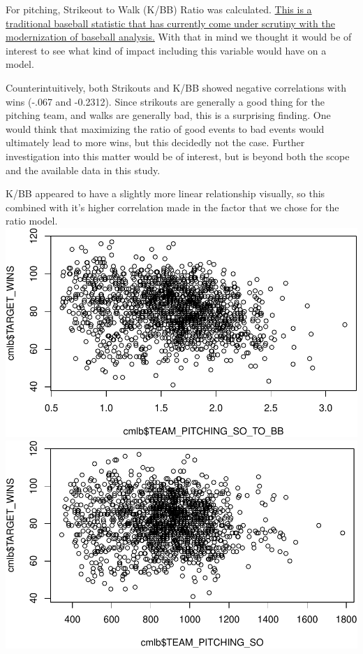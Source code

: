 \documentclass[]{article}
\begin{document}
For pitching, Strikeout to Walk (K/BB) Ratio was calculated.
\href{http://www.beyondtheboxscore.com/2012/11/25/3686732/stop-using-k-bb}{This
is a traditional baseball statistic that has currently come under
scrutiny with the modernization of baseball analysis.} With that in mind
we thought it would be of interest to see what kind of impact including
this variable would have on a model.

Counterintuitively, both Strikouts and K/BB showed negative correlations
with wins (-.067 and -0.2312). Since strikouts are generally a good
thing for the pitching team, and walks are generally bad, this is a
surprising finding. One would think that maximizing the ratio of good
events to bad events would ultimately lead to more wins, but this
decidedly not the case. Further investigation into this matter would be
of interest, but is beyond both the scope and the available data in this
study.

K/BB appeared to have a slightly more linear relationship visually, so
this combined with it's higher correlation made in the factor that we
chose for the ratio model.\\
\includegraphics{DATA621-Homework-1_files/figure-latex/unnamed-chunk-26-1.pdf}
\includegraphics{DATA621-Homework-1_files/figure-latex/unnamed-chunk-26-2.pdf}
\end{document}
